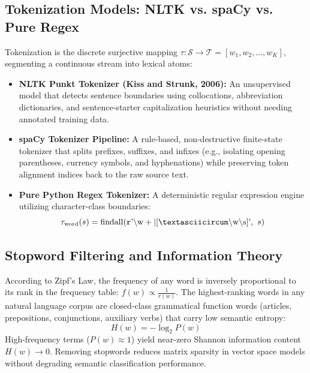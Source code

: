 \documentclass[12pt,a4paper]{report}
\begin{document}
\subsection{Tokenization Models: NLTK vs. spaCy vs. Pure Regex}
Tokenization is the discrete surjective mapping $\tau: \mathcal{S} \to \mathcal{T} = [w_1, w_2, \dots, w_K]$, segmenting a continuous stream into lexical atoms:
\begin{itemize}
    \item \textbf{NLTK Punkt Tokenizer (Kiss and Strunk, 2006):} An unsupervised model that detects sentence boundaries using collocations, abbreviation dictionaries, and sentence-starter capitalization heuristics without needing annotated training data.
    \item \textbf{spaCy Tokenizer Pipeline:} A rule-based, non-destructive finite-state tokenizer that splits prefixes, suffixes, and infixes (e.g., isolating opening parentheses, currency symbols, and hyphenations) while preserving token alignment indices back to the raw source text.
    \item \textbf{Pure Python Regex Tokenizer:} A deterministic regular expression engine utilizing character-class boundaries:
    \begin{equation}
        \tau_{\text{word}}(s) = \operatorname{findall}(\texttt{r}\text{'}\backslash\text{w}+|[\textasciicircum\backslash\text{w}\backslash\text{s}]\text{'},\ s)
    \end{equation}
\end{itemize}

\subsection{Stopword Filtering and Information Theory}
According to Zipf's Law, the frequency of any word is inversely proportional to its rank in the frequency table: $f(w) \propto \frac{1}{r(w)}$. The highest-ranking words in any natural language corpus are closed-class grammatical function words (articles, prepositions, conjunctions, auxiliary verbs) that carry low semantic entropy:
\begin{equation}
    H(w) = -\log_2 P(w)
\end{equation}
High-frequency terms ($P(w) \approx 1$) yield near-zero Shannon information content $H(w) \to 0$. Removing stopwords reduces matrix sparsity in vector space models without degrading semantic classification performance.
\end{document}
